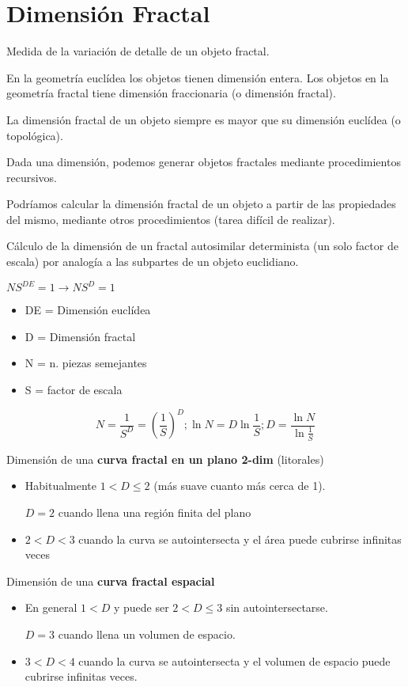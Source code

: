 \section{Dimensión Fractal}
Medida de la variación de detalle de un objeto fractal.

En la geometría euclídea los objetos tienen dimensión entera. Los objetos en la geometría fractal tiene dimensión fraccionaria (o dimensión fractal).

La dimensión fractal de un objeto siempre es mayor que su dimensión euclídea (o topológica).

Dada una dimensión, podemos generar objetos fractales mediante procedimientos recursivos.

Podríamos calcular la dimensión fractal de un objeto a partir de las propiedades del mismo, mediante otros procedimientos (tarea difícil de realizar).

Cálculo de la dimensión de un fractal autosimilar determinista (un solo factor de escala) por analogía a las subpartes de un objeto euclidiano.

$NS^{DE}=1 \rightarrow NS^{D}=1$
\begin{itemize}
	\item DE = Dimensión euclídea
	\item D = Dimensión fractal
	\item N = n. piezas semejantes
	\item S = factor de escala
\end{itemize}
$$N=\frac{1}{S^D}=\left(\frac{1}{S}\right)^D; \ln N = D \ln \frac{1}{S}; D = \frac{\ln N}{\ln \frac{1}{S}}$$

Dimensión de una \textbf{curva fractal en un plano 2-dim} (litorales)
\begin{itemize}
	\item Habitualmente $1<D \leq 2$ (más suave cuanto más cerca de 1).

	      $D = 2$ cuando llena una región finita del plano
	\item $2<D<3$ cuando la curva se autointersecta y el área puede cubrirse infinitas veces
\end{itemize}

Dimensión de una \textbf{curva fractal espacial}
\begin{itemize}
	\item En general $1 < D$ y puede ser $2 < D \leq 3$ sin autointersectarse.

	      $D = 3$ cuando llena un volumen de espacio.
	\item $3 < D < 4$ cuando la curva se autointersecta y el volumen de espacio puede cubrirse
	      infinitas veces.
\end{itemize}


